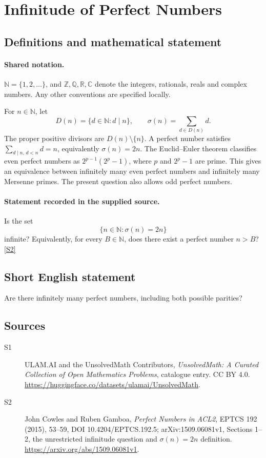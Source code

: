 \documentclass[11pt]{article}
\newcommand{\sref}[2]{\hyperlink{source:#1:#2}{[S#2]}}
\begin{document}
\section{Infinitude of Perfect Numbers}\label{statement}

\subsection{Definitions and mathematical statement}

\paragraph{Shared notation.}$\mathbb N=\{1,2,\ldots\}$, and $\mathbb Z,\mathbb Q,\mathbb R,\mathbb C$ denote the integers, rationals, reals and complex numbers. Any other conventions are specified locally.


For \(n\in\mathbb N\), let
\[
 D(n)=\{d\in\mathbb N:d\mid n\},\qquad
 \sigma(n)=\sum_{d\in D(n)}d.
\]
The proper positive divisors are \(D(n)\setminus\{n\}\).
A perfect number satisfies \(\sum_{d\mid n,\,d<n}d=n\), equivalently
\(\sigma(n)=2n\).
The Euclid--Euler theorem classifies even perfect numbers as
\(2^{p-1}(2^p-1)\), where \(p\) and \(2^p-1\) are prime.
This gives an equivalence between infinitely many even perfect numbers
and infinitely many Mersenne primes. The present question also allows
odd perfect numbers.
\paragraph{Statement recorded in the supplied source.}
Is the set
\[
                    \{n\in\mathbb N:\sigma(n)=2n\}
\]
infinite? Equivalently, for every \(B\in\mathbb N\), does there exist
a perfect number \(n>B\)? \sref{statement}{2}
\subsection{Short English statement}
Are there infinitely many perfect numbers, including both possible parities?
\subsection{Sources}
\begin{description}
\item[\hypertarget{source:statement:1}{S1}] ULAM.AI and the UnsolvedMath Contributors, \emph{UnsolvedMath: A Curated Collection of Open Mathematics Problems}, catalogue entry. CC BY 4.0. \url{https://huggingface.co/datasets/ulamai/UnsolvedMath}.
\item[\hypertarget{source:statement:2}{S2}] John Cowles and Ruben Gamboa, \emph{Perfect Numbers in ACL2}, EPTCS 192 (2015), 53--59, DOI 10.4204/EPTCS.192.5; arXiv:1509.06081v1, Sections 1--2, the unrestricted infinitude question and $\sigma(n)=2n$ definition. \url{https://arxiv.org/abs/1509.06081v1}.
\end{description}
\label{end:statement}
\end{document}
